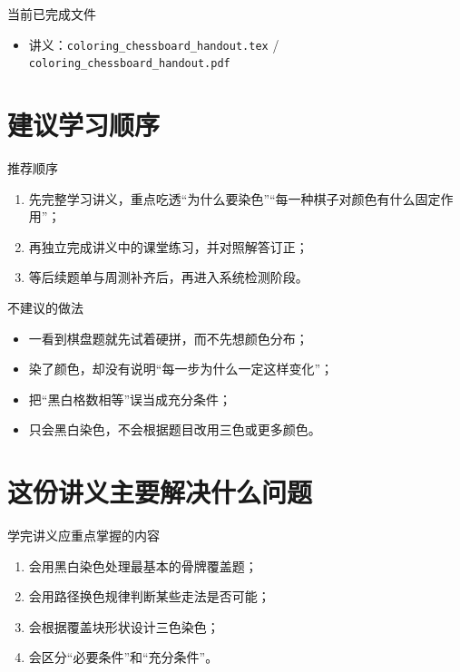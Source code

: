 \documentclass[11pt,a4paper,fontset=fandol]{ctexart}
\begin{document}
\begin{infobox}{当前已完成文件}
\begin{itemize}
  \item 讲义：\texttt{coloring\_chessboard\_handout.tex} / \texttt{coloring\_chessboard\_handout.pdf}
\end{itemize}
\end{infobox}

\section{建议学习顺序}

\begin{goalbox}{推荐顺序}
\begin{enumerate}
  \item 先完整学习讲义，重点吃透“为什么要染色”“每一种棋子对颜色有什么固定作用”；
  \item 再独立完成讲义中的课堂练习，并对照解答订正；
  \item 等后续题单与周测补齐后，再进入系统检测阶段。
\end{enumerate}
\end{goalbox}

\begin{warnbox}{不建议的做法}
\begin{itemize}
  \item 一看到棋盘题就先试着硬拼，而不先想颜色分布；
  \item 染了颜色，却没有说明“每一步为什么一定这样变化”；
  \item 把“黑白格数相等”误当成充分条件；
  \item 只会黑白染色，不会根据题目改用三色或更多颜色。
\end{itemize}
\end{warnbox}

\section{这份讲义主要解决什么问题}

\begin{goalbox}{学完讲义应重点掌握的内容}
\begin{enumerate}
  \item 会用黑白染色处理最基本的骨牌覆盖题；
  \item 会用路径换色规律判断某些走法是否可能；
  \item 会根据覆盖块形状设计三色染色；
  \item 会区分“必要条件”和“充分条件”。
\end{enumerate}
\end{goalbox}
\end{document}
